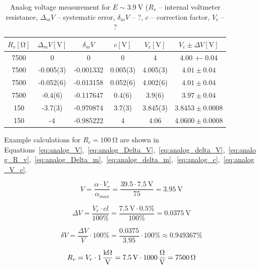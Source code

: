 \begin{table}[H]
	\centering
	\begin{tabular}{ c | c | c | c | c | c}
		$R_v [\unit{\ohm}]$  & $\Delta_m V [\unit{\volt}]$ & $\delta_m V $ & $c [\unit{\volt}]$ & $V_c [\unit{\volt}]$ & $V_c \pm \Delta V [\unit{\volt}]$\\
		\hline
		7500 & 0 & 0 & 0 & 4 & 4.00 +- 0.04\\
		\hline
		7500 & -0.005(3) & -0.001332 & 0.005(3) & 4.005(3) & $4.01 \pm  0.04$\\
		\hline
		7500 & -0.052(6) & -0.013158 & 0.052(6) & 4.002(6) & $4.01 \pm 0.04$\\
		\hline
		7500 & -0.4(6) & -0.117647 & 0.4(6) & 3.9(6) & $3.97 \pm 0.04$\\
		\hline
		150 & -3.7(3) & -0.970874 & 3.7(3) & 3.845(3) & $3.8453 \pm 0.0008$\\
		\hline
		150 & -4 & -0.985222 & 4 & 4.06 & $4.0600 \pm 0.0008$
	\end{tabular}
	\caption{Analog voltage measurement for $E \sim \SI{3.9}{\volt}$ ($R_v$ -- internal voltmeter resistance, $\Delta_m V$ -- systematic error, $\delta_m V$ -- ?, $c$ -- correction factor, $V_c$ -- ?}
	\label{tab:analog_volt_2}
\end{table}

Example calculations for $R_c = \SI{100}{\ohm} $ are shown in Equations~\ref{eq:analog_V},~\ref{eq:analog_Delta_V},~\ref{eq:analog_delta_V},~\ref{eq:analog_R_v},~\ref{eq:analog_Delta_m},~\ref{eq:analog_delta_m},~\ref{eq:analog_c},~\ref{eq:analog_V_c}.

\begin{equation}
	 V = \frac{\alpha\cdot V_{r}}{\alpha_{max}} = \frac{39.5\cdot \SI{7.5}{\volt}}{75} = \SI{3.95}{\volt}
	 \label{eq:analog_V}
\end{equation}

\begin{equation}
	\Delta V = \frac{V_{r}\cdot cl}{100\unit{\percent}} = \frac{\SI{7.5}{\volt}\cdot 0.5\unit{\percent}}{100 \unit{\percent}} = \SI{0.0375}{\volt}
	\label{eq:analog_Delta_V}
\end{equation}

\begin{equation}
	  \delta V = \frac{\Delta V}{V}\cdot 100\unit{\percent} = \frac{0.0375}{3.95}\cdot 100\unit{\percent} \approx 0.949367\unit{\percent}
	  \label{eq:analog_delta_V}
\end{equation}

\begin{equation}
	R_v = V_r\cdot \SI{1}{\frac{\kilo\ohm}{\volt}} = \SI{7.5}{\volt}\cdot \SI{1000}{\frac{\ohm}{\volt}} = \SI{7500}{\ohm}
	\label{eq:analog_R_v}
\end{equation}

